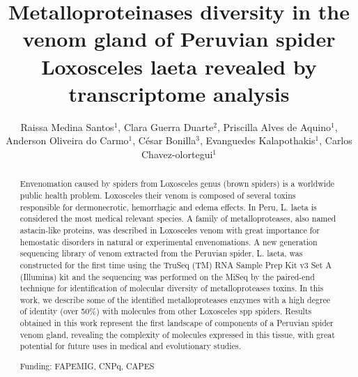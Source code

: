 \documentclass[twoside]{article}
\title{\vspace{-15mm}\fontsize{24pt}{10pt}\selectfont\textbf{Metalloproteinases diversity in the venom gland of Peruvian spider Loxosceles laeta revealed by transcriptome analysis}} %
\author{Raissa Medina Santos$^1$, Clara Guerra Duarte$^2$, Priscilla Alves de Aquino$^1$, Anderson Oliveira do Carmo$^1$, C\'esar Bonilla$^3$, Evanguedes Kalapothakis$^1$, Carlos Chavez-olortegui$^1$}
\affil{1 UFMG\\ 2 FUNDA\c{C}\~AO EZEQUIEL DIAS\\ 3 INSTITUTO NACIONAL DE SALUD\\ }
\date{}
\begin{document}
\maketitle %

\thispagestyle{fancy} %


\begin{abstract}
Envenomation caused by spiders from Loxosceles genus (brown spiders) is a worldwide public health problem. Loxosceles their venom is composed of several toxins responsible for dermonecrotic, hemorrhagic and edema effects. In Peru, L. laeta is considered  the most medical relevant species. A family of metalloproteases, also named astacin-like proteins, was described in Loxosceles venom with great importance for hemostatic disorders in natural or experimental envenomations. A new generation sequencing library of venom extracted from the Peruvian spider, L. laeta, was constructed for the first time using the TruSeq (TM) RNA Sample Prep Kit v3 Set A (Illumina) kit and the sequencing was performed on the MiSeq by the paired-end technique for identification of molecular diversity of metalloproteases toxins. In this work, we describe some of the identified metalloproteases enzymes with a high degree of identity (over 50\%) with molecules from other Loxosceles spp spiders. Results obtained in this work represent the first landscape of components of a Peruvian spider venom gland, revealing the complexity of molecules expressed in this tissue, with great potential for future uses in medical and evolutionary studies.

Funding: FAPEMIG, CNPq, CAPES
\end{abstract}
\end{document}

